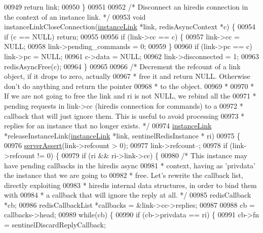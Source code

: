 \begin{DoxyCode}
{{{{{{{{{{{{{{{00949     \textcolor{keywordflow}{return} link;
00950 \}
00951 
00952 \textcolor{comment}{/* Disconnect an hiredis connection in the context of an instance link. */}
00953 \textcolor{keywordtype}{void} instanceLinkCloseConnection(\hyperlink{structinstanceLink}{instanceLink} *link, redisAsyncContext *c) \{
00954     \textcolor{keywordflow}{if} (c == NULL) \textcolor{keywordflow}{return};
00955 
00956     \textcolor{keywordflow}{if} (link->cc == c) \{
00957         link->cc = NULL;
00958         link->pending\_commands = 0;
00959     \}
00960     \textcolor{keywordflow}{if} (link->pc == c) link->pc = NULL;
00961     c->data = NULL;
00962     link->disconnected = 1;
00963     redisAsyncFree(c);
00964 \}
00965 
00966 \textcolor{comment}{/* Decrement the refcount of a link object, if it drops to zero, actually}
00967 \textcolor{comment}{ * free it and return NULL. Otherwise don't do anything and return the pointer}
00968 \textcolor{comment}{ * to the object.}
00969 \textcolor{comment}{ *}
00970 \textcolor{comment}{ * If we are not going to free the link and ri is not NULL, we rebind all the}
00971 \textcolor{comment}{ * pending requests in link->cc (hiredis connection for commands) to a}
00972 \textcolor{comment}{ * callback that will just ignore them. This is useful to avoid processing}
00973 \textcolor{comment}{ * replies for an instance that no longer exists. */}
00974 \hyperlink{structinstanceLink}{instanceLink} *releaseInstanceLink(\hyperlink{structinstanceLink}{instanceLink} *link, sentinelRedisInstance *
      ri)
00975 \{
00976     \hyperlink{server_8h_a88114b5169b4c382df6b56506285e56a}{serverAssert}(link->refcount > 0);
00977     link->refcount--;
00978     \textcolor{keywordflow}{if} (link->refcount != 0) \{
00979         \textcolor{keywordflow}{if} (ri && ri->link->cc) \{
00980             \textcolor{comment}{/* This instance may have pending callbacks in the hiredis async}
00981 \textcolor{comment}{             * context, having as 'privdata' the instance that we are going to}
00982 \textcolor{comment}{             * free. Let's rewrite the callback list, directly exploiting}
00983 \textcolor{comment}{             * hiredis internal data structures, in order to bind them with}
00984 \textcolor{comment}{             * a callback that will ignore the reply at all. */}
00985             redisCallback *cb;
00986             redisCallbackList *callbacks = &link->cc->replies;
00987 
00988             cb = callbacks->head;
00989             \textcolor{keywordflow}{while}(cb) \{
00990                 \textcolor{keywordflow}{if} (cb->privdata == ri) \{
00991                     cb->fn = sentinelDiscardReplyCallback;
}}}}}}}}}}}}}}}
\end{DoxyCode}
